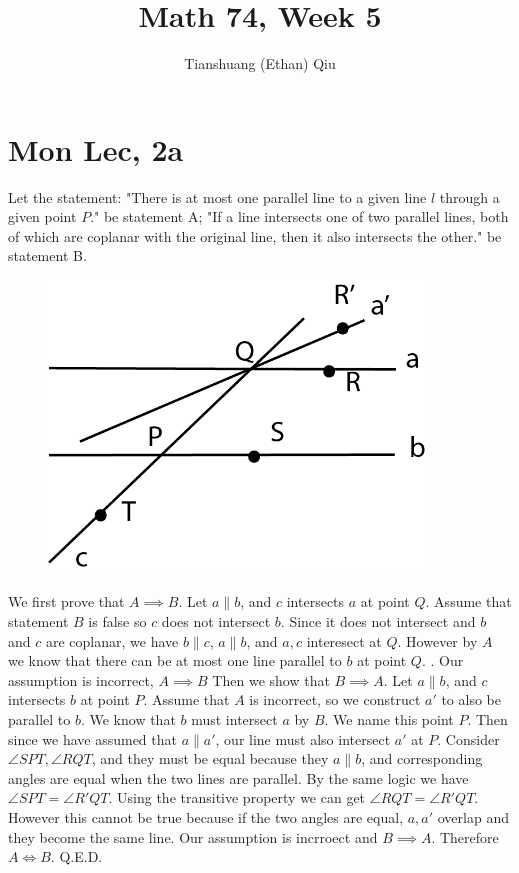\documentclass[12pt]{article}
\author{Tianshuang (Ethan) Qiu}
\begin{document}
\title{Math 74, Week 5}
\maketitle


\section{Mon Lec, 2a}
Let the statement: "There is at most one parallel line to a given line $l$ through a given point $P$." be statement A;
\newline
"If a line intersects one of two parallel lines, both of which are coplanar with the original line, then it also intersects the other." be statement B.
\newline
\begin{figure}[h]
    \includegraphics[width = 100mm]{GRAPH1.png}
\end{figure}
\newline
We first prove that $A \implies B$. Let $a \parallel b$, and $c$ intersects $a$ at point $Q$. Assume that statement $B$ is false so $c$ does not intersect $b$. Since it does not intersect and $b$ and $c$ are coplanar, we have $b \parallel c$, $a \parallel b$, and $a, c$ interesect at $Q$. However by $A$ we know that there can be at most one line parallel to $b$ at point $Q$. \lightning. Our assumption is incorrect, $A \implies B$
\newline
Then we show that $B \implies A$. Let $a \parallel b$, and $c$ intersects $b$ at point $P$. Assume that $A$ is incorrect, so we construct $a'$ to also be parallel to $b$. We know that $b$ must intersect $a$ by $B$. We name this point $P$. Then since we have assumed that $a \parallel a'$, our line must also intersect $a'$ at $P$. Consider $\angle SPT, \angle RQT$, and they must be equal because they $a \parallel b$, and corresponding angles are equal when the two lines are parallel. By the same logic we have $\angle SPT = \angle R'QT$.
\newline
Using the transitive property we can get $\angle RQT = \angle R'QT$. However this cannot be true because if the two angles are equal, $a, a'$ overlap and they become the same line. \lightning
\newline
Our assumption is incrroect and $B \implies A$. Therefore $A \iff B$. Q.E.D.
\end{document}
